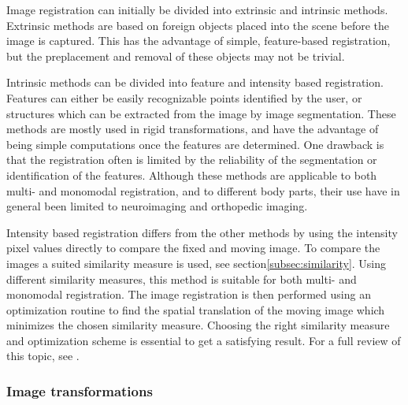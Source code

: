 Image registration can initially be divided into extrinsic and intrinsic methods. Extrinsic methods are based on foreign objects placed into the scene before the image is captured. This has the advantage of simple, feature-based registration, but the preplacement and removal of these objects may not be trivial. 

Intrinsic methods can be divided into feature and intensity based registration. Features can either be easily recognizable points identified by the user, or structures which can be extracted from the image by image segmentation. These methods are mostly used in rigid transformations, and have the advantage of being simple computations once the features are determined. One drawback is that the registration often is limited by the reliability of the segmentation or identification of the features. Although these methods are applicable to both multi- and monomodal registration, and to different body parts, their use have in general been limited to neuroimaging and orthopedic imaging\cite{Maintz1998}.

Intensity based registration differs from the other methods by using the intensity pixel values directly to compare the fixed and moving image. To compare the images a suited similarity measure is used, see section\ref{subsec:similarity}. Using different similarity measures, this method is suitable for both multi- and monomodal registration. The image registration is then performed using an optimization routine to find the spatial translation of the moving image which minimizes the chosen similarity measure. Choosing the right similarity measure and optimization scheme is essential to get a satisfying result. For a full review of this topic, see \cite{Maintz1998}.

%

\subsubsection{Image transformations}

